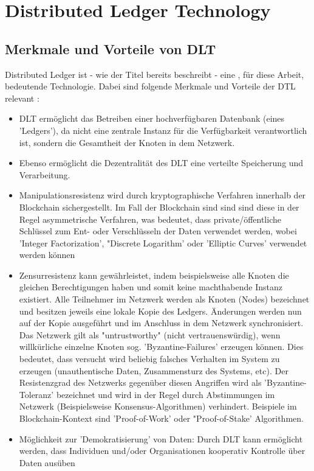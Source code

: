 \chapter{Distributed Ledger Technology}
\label{cha:distributedLedgerTechnology}

\section{Merkmale und Vorteile von DLT}
Distributed Ledger ist - wie der Titel bereits beschreibt - eine , für diese Arbeit, bedeutende Technologie. Dabei sind folgende Merkmale und Vorteile der DTL relevant \cite{ID19}:
\begin{itemize}
	\item DLT ermöglicht das Betreiben einer hochverfügbaren Datenbank (eines 'Ledgers'), da nicht eine zentrale Instanz für die Verfügbarkeit verantwortlich ist, sondern die Gesamtheit der Knoten in dem Netzwerk.
	
	\item Ebenso ermöglicht die Dezentralität des DLT eine verteilte Speicherung und Verarbeitung.
	
	\item Manipulationsresistenz wird durch kryptographische Verfahren innerhalb der Blockchain sichergestellt. Im Fall  der Blockchain sind sind sind diese in der Regel asymmetrische Verfahren, was bedeutet, dass private/öffentliche Schlüssel zum Ent- oder Verschlüsseln der Daten verwendet werden, wobei 'Integer Factorization', "Discrete Logarithm' oder 'Elliptic Curves' verwendet werden können \cite{ID23}
	
	\item Zensurresistenz kann gewährleistet, indem beispielsweise alle Knoten die gleichen Berechtigungen haben und somit keine machthabende Instanz existiert. Alle Teilnehmer im Netzwerk werden als Knoten (Nodes) bezeichnet und besitzen jeweils eine lokale Kopie des Ledgers. Änderungen werden nun auf der Kopie ausgeführt und im Anschluss in dem Netzwerk synchronisiert. Das Netzwerk gilt als "untrustworthy" (nicht vertrauenswürdig), wenn willkürliche einzelne Knoten sog. 'Byzantine-Failures' \cite{ID20} \cite{ID21} erzeugen können. Dies bedeutet, dass versucht wird beliebig falsches Verhalten im System zu erzeugen (unauthentische Daten, Zusammensturz des Systems, etc). Der Resistenzgrad des Netzwerks gegenüber diesen Angriffen wird als 'Byzantine-Toleranz' bezeichnet und wird in der Regel durch Abstimmungen im Netzwerk (Beispielsweise Konsensus-Algorithmen) verhindert. Beispiele im Blockchain-Kontext sind 'Proof-of-Work' oder "Proof-of-Stake' \cite{ID22} Algorithmen.
	
	\item Möglichkeit zur 'Demokratisierung' von Daten: Durch DLT kann ermöglicht werden, dass Individuen und/oder Organisationen kooperativ Kontrolle über Daten ausüben
	
\end{itemize}

